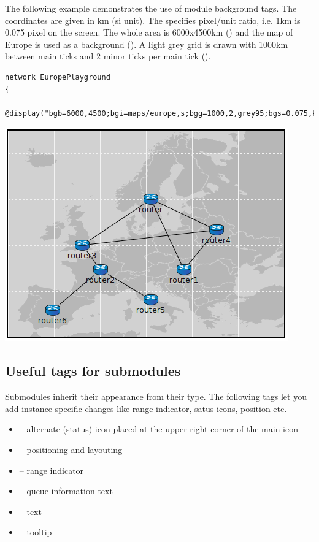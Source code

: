 The following example demonstrates the use of module background tags.
The coordinates are given in km (si unit). The 
specifies pixel/unit ratio, i.e. 1km is 0.075 pixel on the screen.
The whole area is 6000x4500km () and the map of Europe is used as a background ().
A light grey grid is drawn with 1000km between main ticks and 2 minor ticks per main tick
().

\begin{verbatim}
network EuropePlayground
{ 
    @display("bgb=6000,4500;bgi=maps/europe,s;bgg=1000,2,grey95;bgs=0.075,km"); 
\end{verbatim}

\begin{center}
\includegraphics{figures/graphics-bgtags}
\end{center}

\subsection{Useful tags for submodules}

Submodules inherit their appearance from their type. 
The following tags let you add instance specific changes
like range indicator, satus icons, position etc.

\begin{itemize}
  \item{ -- alternate (status) icon placed at the upper right corner of the main icon}
  \item{ -- positioning and layouting}
  \item{ -- range indicator}
  \item{ -- queue information text}
  \item{ -- text}
  \item{ -- tooltip}
\end{itemize}

